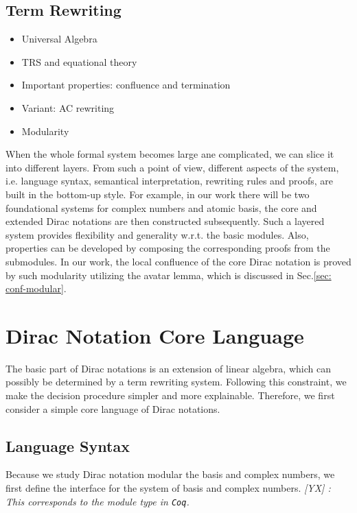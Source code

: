 \documentclass[manuscript, review, timestamp]{acmart}
\newcommand{\yx}[1]{\textit{\color{blue}[YX] : #1}}
\begin{document}
\subsection{Term Rewriting}

\begin{itemize}
  \item Universal Algebra

  \item TRS and equational theory
  
  \item Important properties: confluence and termination
  
  \item Variant: AC rewriting
  
  \item Modularity
\end{itemize}

When the whole formal system becomes large ane complicated, we can slice it into different layers. From such a point of view, different aspects of the system, i.e. language syntax, semantical interpretation, rewriting rules and proofs, are built in the bottom-up style. For example, in our work there will be two foundational systems for complex numbers and atomic basis, the core and extended Dirac notations are then constructed subsequently. Such a layered system provides flexibility and generality w.r.t. the basic modules. Also, properties can be developed by composing the corresponding proofs from the submodules. In our work, the local confluence of the core Dirac notation is proved by such modularity utilizing the avatar lemma, which is discussed in Sec.\ref{sec: conf-modular}.


\section{Dirac Notation Core Language}

The basic part of Dirac notations is an extension of linear algebra, which can possibly be determined by a term rewriting system. Following this constraint, we make the decision procedure simpler and more explainable. Therefore, we first consider a simple core language of Dirac notations.



\subsection{Language Syntax}

Because we study Dirac notation modular the basis and complex numbers, we first define the interface for the system of basis and complex numbers. \yx{This corresponds to the module type in \texttt{Coq}.}
\end{document}
